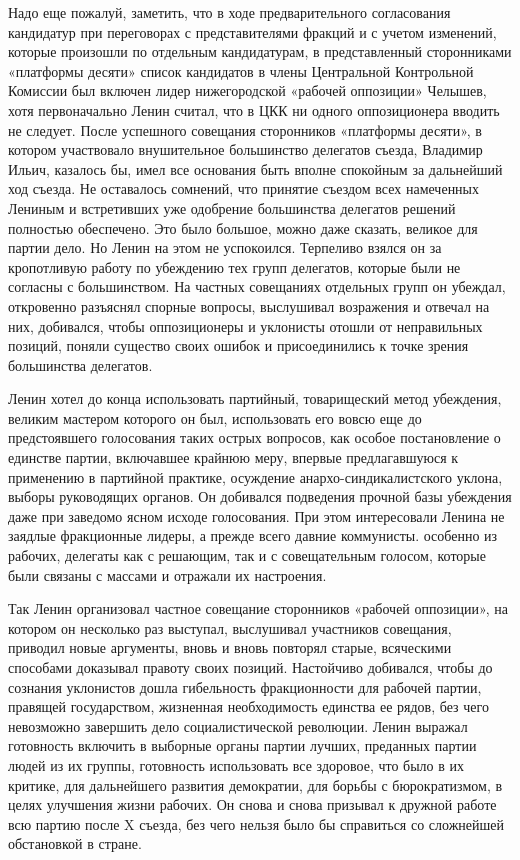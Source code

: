 \documentclass[12pt, a4paper, openany]{book}
\begin{document}
Надо еще пожалуй, заметить, что в ходе предварительного согласования кандидатур при переговорах с представителями фракций и с учетом изменений, которые произошли по отдельным кандидатурам, в представленный сторонниками «платформы десяти» список кандидатов в члены Центральной Контрольной Комиссии был включен лидер нижегородской «рабочей оппозиции» Челышев, хотя первоначально Ленин считал, что в ЦКК ни одного оппозиционера вводить не следует. После успешного совещания сторонников «платформы десяти», в котором участвовало внушительное большинство делегатов съезда, Владимир Ильич, казалось бы, имел все основания быть вполне спокойным за дальнейший ход съезда. Не оставалось сомнений, что принятие съездом всех намеченных Лениным и встретивших уже одобрение большинства делегатов решений полностью обеспечено. Это было большое, можно даже сказать, великое для партии дело. Но Ленин на этом не успокоился. Терпеливо взялся он за кропотливую работу по убеждению тех групп делегатов, которые были не согласны с большинством. На частных совещаниях отдельных групп он убеждал, откровенно разъяснял спорные вопросы, выслушивал возражения и отвечал на них, добивался, чтобы оппозиционеры и уклонисты отошли от неправильных позиций, поняли существо своих ошибок и присоединились к точке зрения большинства делегатов.

Ленин хотел до конца использовать партийный, товарищеский метод убеждения, великим мастером которого он был, использовать его вовсю еще до предстоявшего голосования таких острых вопросов, как особое постановление о единстве партии, включавшее крайнюю меру, впервые предлагавшуюся к применению в партийной практике, осуждение анархо-синдикалистского уклона, выборы руководящих органов. Он добивался подведения прочной базы убеждения даже при заведомо ясном исходе голосования. При этом интересовали Ленина не заядлые фракционные лидеры, а прежде всего давние коммунисты. особенно из рабочих, делегаты как с решающим, так и с совещательным голосом, которые были связаны с массами и отражали их настроения.

Так Ленин организовал частное совещание сторонников «рабочей оппозиции», на котором он несколько раз выступал, выслушивал участников совещания, приводил новые аргументы, вновь и вновь повторял старые, всяческими способами доказывал правоту своих позиций. Настойчиво добивался, чтобы до сознания уклонистов дошла гибельность фракционности для рабочей партии, правящей государством, жизненная необходимость единства ее рядов, без чего невозможно завершить дело социалистической революции. Ленин выражал готовность включить в выборные органы партии лучших, преданных партии людей из их группы, готовность использовать все здоровое, что было в их критике, для дальнейшего развития демократии, для борьбы с бюрократизмом, в целях улучшения жизни рабочих. Он снова и снова призывал к дружной работе всю партию после X съезда, без чего нельзя было бы справиться со сложнейшей обстановкой в стране.
\end{document}
